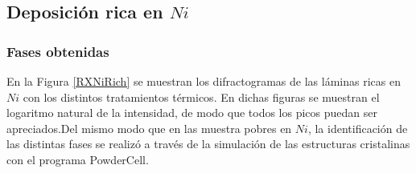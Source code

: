 \documentclass[12pt]{article}
\theoremstyle{definition}
\theoremstyle{remark}
\begin{document}
{\subsection{Deposición rica en $Ni$}
\subsubsection{Fases obtenidas}
En la Figura \ref{RXNiRich} se muestran los difractogramas de las láminas ricas en $Ni$ con los distintos tratamientos térmicos. En dichas figuras se muestran el logaritmo natural de la intensidad, de modo que todos los picos puedan ser apreciados.Del mismo modo que en las muestra pobres en $Ni$, la identificación de las distintas fases se realizó a través de la simulación de las estructuras cristalinas con el programa PowderCell.

\begin{figure}[H]
 \\

\end{figure}}
\end{document}
